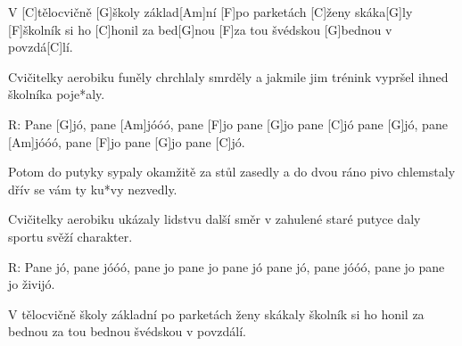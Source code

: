 
V [C]tělocvičně [G]\null školy základ[Am]ní
[F]po parketách [C]\null ženy skáka[G]ly
[F]\null školník si ho [C]honil za bed[G]nou
[F]za tou švédskou [G]bednou v povzdá[C]lí.

Cvičitelky aerobiku
funěly chrchlaly smrděly
a jakmile jim trénink vypršel
ihned školníka poje*aly.

R: Pane [G]jó, pane [Am]jóóó, pane [F]jo pane [G]jo pane [C]jó
pane [G]jó, pane [Am]jóóó, pane [F]jo pane [G]jo pane [C]jó.

Potom do putyky sypaly
okamžitě za stůl zasedly
a do dvou ráno pivo chlemstaly
dřív se vám ty ku*vy nezvedly.

Cvičitelky aerobiku
ukázaly lidstvu další směr
v zahulené staré putyce
daly sportu svěží charakter.

R: Pane jó, pane jóóó, pane jo pane jo pane jó
pane jó, pane jóóó, pane jo pane jo živijó.

V tělocvičně školy základní
po parketách ženy skákaly
školník si ho honil za bednou
za tou bednou švédskou v povzdálí.